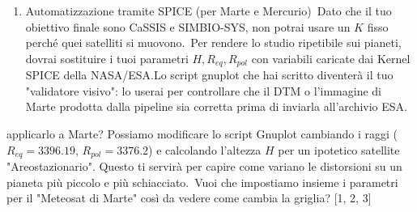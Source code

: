 \documentclass[a4paper,14pt]{article}
\begin{document}
\begin{enumerate}
\begin{verbatim}
 gdalwarp -t_srs EPSG:4326 immagine_con_metadati.tif mappa_finale.tif
\end{verbatim}
\item Automatizzazione tramite SPICE (per Marte e Mercurio) Dato che il tuo obiettivo finale sono CaSSIS e SIMBIO-SYS, non potrai usare un \(K\) fisso perché quei satelliti si muovono. Per rendere lo studio ripetibile sui pianeti, dovrai sostituire i tuoi parametri \(H,R_{eq},R_{pol}\) con variabili caricate dai Kernel SPICE della NASA/ESA.Lo script gnuplot che hai scritto diventerà il tuo "validatore visivo": lo userai per controllare che il DTM o l'immagine di Marte prodotta dalla pipeline sia corretta prima di inviarla all'archivio ESA.
\end{enumerate}
applicarlo a Marte? Possiamo modificare lo script Gnuplot cambiando i raggi (\(R_{eq}=3396.19\), \(R_{pol}=3376.2\)) e calcolando l'altezza \(H\) per un ipotetico satellite "Areostazionario". Questo ti servirà per capire come variano le distorsioni su un pianeta più piccolo e più schiacciato. Vuoi che impostiamo insieme i parametri per il "Meteosat di Marte" così da vedere come cambia la griglia? [1, 2, 3]
\end{document}
